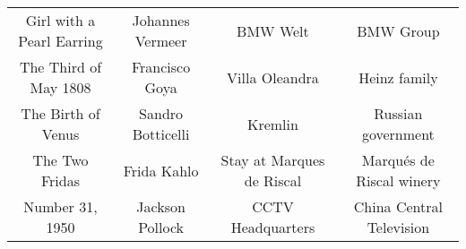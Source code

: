 \begin{table}[ht]
\begin{adjustbox}{width=1\linewidth}
\begin{tabular}{cccc}
        \multicolumn{1}{c|}{Girl with a Pearl Earring}                                                                   & \multicolumn{1}{c|}{{\color[HTML]{0D0D0D} Johannes Vermeer}}  & \multicolumn{1}{c|}{BMW Welt}                  & BMW Group                \\
        \multicolumn{1}{c|}{The Third of May 1808}                                                                       & \multicolumn{1}{c|}{{\color[HTML]{0D0D0D} Francisco Goya}}    & \multicolumn{1}{c|}{Villa Oleandra}            & Heinz family             \\
        \multicolumn{1}{c|}{The Birth of Venus}                                                                          & \multicolumn{1}{c|}{{\color[HTML]{0D0D0D} Sandro Botticelli}} & \multicolumn{1}{c|}{Kremlin}                   & Russian government       \\
        \multicolumn{1}{c|}{The Two Fridas}                                                                              & \multicolumn{1}{c|}{Frida Kahlo}                              & \multicolumn{1}{c|}{Stay at Marques de Riscal} & Marqués de Riscal winery \\
        \multicolumn{1}{c|}{Number 31, 1950}                                                                             & \multicolumn{1}{c|}{Jackson Pollock}                          & \multicolumn{1}{c|}{CCTV Headquarters}         & China Central Television \\
        \bottomrule
        \end{tabular}
    \end{adjustbox}
\end{table}

